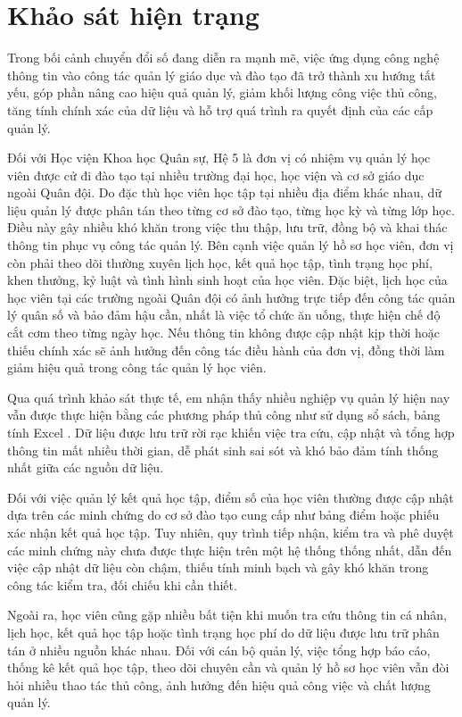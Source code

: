 \documentclass[../DoAn.tex]{subfiles}
\begin{document}
\section{Khảo sát hiện trạng}
\label{section:2.1}
Trong bối cảnh chuyển đổi số đang diễn ra mạnh mẽ, việc ứng dụng công nghệ thông tin vào công tác quản lý giáo dục và đào tạo đã trở thành xu hướng tất yếu, góp phần nâng cao hiệu quả quản lý, giảm khối lượng công việc thủ công, tăng tính chính xác của dữ liệu và hỗ trợ quá trình ra quyết định của các cấp quản lý.

Đối với Học viện Khoa học Quân sự, Hệ 5 là đơn vị có nhiệm vụ quản lý học viên được cử đi đào tạo tại nhiều trường đại học, học viện và cơ sở giáo dục ngoài Quân đội. Do đặc thù học viên học tập tại nhiều địa điểm khác nhau, dữ liệu quản lý được phân tán theo từng cơ sở đào tạo, từng học kỳ và từng lớp học. Điều này gây nhiều khó khăn trong việc thu thập, lưu trữ, đồng bộ và khai thác thông tin phục vụ công tác quản lý.
Bên cạnh việc quản lý hồ sơ học viên, đơn vị còn phải theo dõi thường xuyên lịch học, kết quả học tập, tình trạng học phí, khen thưởng, kỷ luật và tình hình sinh hoạt của học viên. Đặc biệt, lịch học của học viên tại các trường ngoài Quân đội có ảnh hưởng trực tiếp đến công tác quản lý quân số và bảo đảm hậu cần, nhất là việc tổ chức ăn uống, thực hiện chế độ cắt cơm theo từng ngày học. Nếu thông tin không được cập nhật kịp thời hoặc thiếu chính xác sẽ ảnh hưởng đến công tác điều hành của đơn vị, đồng thời làm giảm hiệu quả trong công tác quản lý học viên.

Qua quá trình khảo sát thực tế, em nhận thấy nhiều nghiệp vụ quản lý hiện nay vẫn được thực hiện bằng các phương pháp thủ công như sử dụng sổ sách, bảng tính Excel . Dữ liệu được lưu trữ rời rạc khiến việc tra cứu, cập nhật và tổng hợp thông tin mất nhiều thời gian, dễ phát sinh sai sót và khó bảo đảm tính thống nhất giữa các nguồn dữ liệu.

Đối với việc quản lý kết quả học tập, điểm số của học viên thường được cập nhật dựa trên các minh chứng do cơ sở đào tạo cung cấp như bảng điểm hoặc phiếu xác nhận kết quả học tập. Tuy nhiên, quy trình tiếp nhận, kiểm tra và phê duyệt các minh chứng này chưa được thực hiện trên một hệ thống thống nhất, dẫn đến việc cập nhật dữ liệu còn chậm, thiếu tính minh bạch và gây khó khăn trong công tác kiểm tra, đối chiếu khi cần thiết.

Ngoài ra, học viên cũng gặp nhiều bất tiện khi muốn tra cứu thông tin cá nhân, lịch học, kết quả học tập hoặc tình trạng học phí do dữ liệu được lưu trữ phân tán ở nhiều nguồn khác nhau. Đối với cán bộ quản lý, việc tổng hợp báo cáo, thống kê kết quả học tập, theo dõi chuyên cần và quản lý hồ sơ học viên vẫn đòi hỏi nhiều thao tác thủ công, ảnh hưởng đến hiệu quả công việc và chất lượng quản lý.
\end{document}
